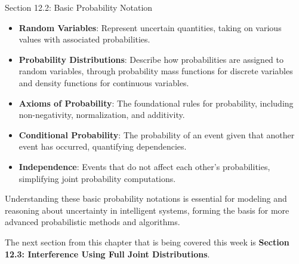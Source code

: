 \begin{notes}{Section 12.2: Basic Probability Notation}
\begin{highlight}
        \begin{itemize}
            \item \textbf{Random Variables}: Represent uncertain quantities, taking on various values with associated probabilities.
            \item \textbf{Probability Distributions}: Describe how probabilities are assigned to random variables, through probability mass functions for discrete variables and density functions for 
            continuous variables.
            \item \textbf{Axioms of Probability}: The foundational rules for probability, including non-negativity, normalization, and additivity.
            \item \textbf{Conditional Probability}: The probability of an event given that another event has occurred, quantifying dependencies.
            \item \textbf{Independence}: Events that do not affect each other's probabilities, simplifying joint probability computations.
        \end{itemize}
    
        Understanding these basic probability notations is essential for modeling and reasoning about uncertainty in intelligent systems, forming the basis for more advanced probabilistic methods and 
        algorithms.
    
    \end{highlight}
\end{notes}

The next section from this chapter that is being covered this week is \textbf{Section 12.3: Interference Using Full Joint Distributions}.


